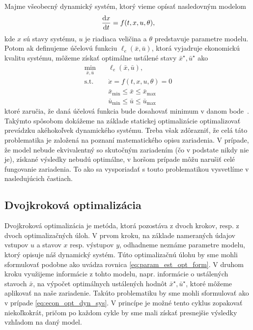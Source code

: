 Majme všeobecný dynamický systém, ktorý vieme opísať nasledovným modelom
\begin{equation*}
	\frac{\text{d}x}{\text{d}t} = f(t, x, u, \theta),
\end{equation*}
kde $ x $ sú stavy systému, $ u $ je riadiaca veličina a $ \theta $ predstavuje parametre modelu. Potom ak definujeme účelovú funkciu $ \ell_e(\bar{x},\bar{u}) $, ktorá vyjadruje ekonomickú kvalitu systému, môžeme získať optimálne ustálené stavy $ \bar{x}^{\star}, \bar{u}^{\star} $ ako
\begin{equation}
	\begin{split}
		\min_{\bar{x},\bar{u}}& \quad \ell_e(\bar{x},\bar{u}), \\
		\text{s.t.}& \quad \dot{x} = f(t, x, u, \theta) = 0 \\
		& \quad \bar{x}_{\min} \leq \bar{x} \leq \bar{x}_{\max} \\
		& \quad \bar{u}_{\min} \leq \bar{u} \leq \bar{u}_{\max}
	\end{split}
	\label{eq:econ_opt_dyn_sys}
\end{equation}
ktoré zaručia, že daná účelová funkcia bude dosahovať minimum v danom bode~\cite{hernandez:economics_opt_w_mismatch:2019}. Takýmto spôsobom dokážeme na základe statickej optimalizácie optimalizovať prevádzku akéhokoľvek dynamického systému. Treba však zdôrazniť, že celá táto problematika je založená na poznaní matematického opisu zariadenia. V prípade, že model nebude ekvivalentný so skutočným zariadením (čo v podstate nikdy nie je), získané výsledky nebudú optimálne, v horšom prípade môžu narušiť celé fungovanie zariadenia. To ako sa vysporiadať s touto problematikou vysvetlíme v nasledujúcich častiach.

\subsection{Dvojkroková optimalizácia}
\label{ch:theory_TwoStep}
Dvojkroková optimalizácia je metóda, ktorá pozostáva z dvoch krokov, resp. z dvoch optimalizačných úloh. V prvom kroku, na základe nameraných údajov vstupov $ u $ a stavov $ x $ resp. výstupov $ y $, odhadneme neznáme parametre modelu, ktorý opisuje náš dynamický systém. Túto optimalizačnú úlohu by sme mohli sformulovať podobne ako uvádza rovnica \eqref{eq:param_est_opt_form}. V druhom kroku využijeme informácie z tohto modelu, napr. informácie o ustálených stavoch $ \bar{x} $, na výpočet optimálnych ustálených hodnôt $ \bar{x}^{\star}, \bar{u}^{\star} $, ktoré môžeme aplikovať na naše zariadenie. Takúto problematiku by sme mohli sformulovať ako v prípade \eqref{eq:econ_opt_dyn_sys}. V princípe je možné tento cyklus zopakovať niekoľkokrát, pričom po každom cykle by sme mali získať presnejšie výsledky vzhľadom na daný model.

